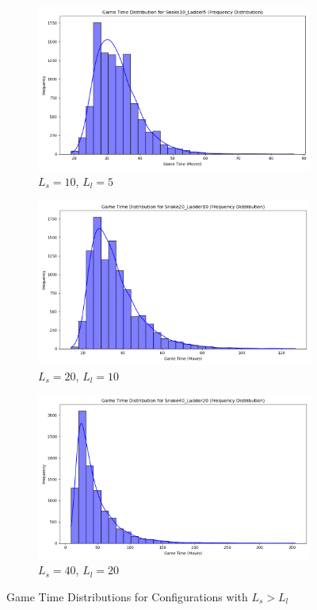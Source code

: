 \documentclass[12pt]{report}
\begin{document}
	\begin{figure}[h]
	\centering
	\begin{subfigure}[b]{0.32\textwidth} 
		\includegraphics[width=\linewidth]{../withLength/UnequalLengths/game_time_distribution_Snake10_Ladder5}
		\caption{$L_s = 10$, $L_l = 5$}
	\end{subfigure}
	\hfill
	\begin{subfigure}[b]{0.32\textwidth}  
		\includegraphics[width=\linewidth]{../withLength/UnequalLengths/game_time_distribution_Snake20_Ladder10}
		\caption{$L_s = 20$, $L_l = 10$}
	\end{subfigure}
	\hfill
	\begin{subfigure}[b]{0.32\textwidth}  
		\includegraphics[width=\linewidth]{../withLength/UnequalLengths/game_time_distribution_Snake40_Ladder20}
		\caption{$L_s = 40$, $L_l = 20$}
	\end{subfigure}
	\caption{Game Time Distributions for Configurations with $L_s > L_l$}
	\end{figure}
\end{document}
